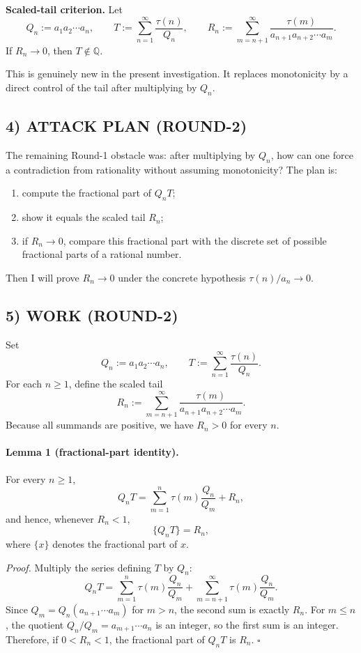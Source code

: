 \medskip
\noindent\textbf{Scaled-tail criterion.}
Let
\[
Q_n:=a_1a_2\cdots a_n,
\qquad
T:=\sum_{n=1}^{\infty}\frac{\tau(n)}{Q_n},
\qquad
R_n:=\sum_{m=n+1}^{\infty}\frac{\tau(m)}{a_{n+1}a_{n+2}\cdots a_m}.
\]
If $R_n\to 0$, then $T\notin\mathbb{Q}$.

This is genuinely new in the present investigation. It replaces monotonicity by a direct control of the tail after multiplying by $Q_n$.

\subsection*{4) ATTACK PLAN (ROUND-2)}
The remaining Round-1 obstacle was: after multiplying by $Q_n$, how can one force a contradiction from rationality without assuming monotonicity? The plan is:
\begin{enumerate}
\item compute the fractional part of $Q_nT$;
\item show it equals the scaled tail $R_n$;
\item if $R_n\to 0$, compare this fractional part with the discrete set of possible fractional parts of a rational number.
\end{enumerate}
Then I will prove $R_n\to 0$ under the concrete hypothesis $\tau(n)/a_n\to 0$.

\subsection*{5) WORK (ROUND-2)}
Set
\[
Q_n:=a_1a_2\cdots a_n,
\qquad
T:=\sum_{n=1}^{\infty}\frac{\tau(n)}{Q_n}.
\]
For each $n\ge 1$, define the scaled tail
\[
R_n:=\sum_{m=n+1}^{\infty}\frac{\tau(m)}{a_{n+1}a_{n+2}\cdots a_m}.
\]
Because all summands are positive, we have $R_n>0$ for every $n$.

\paragraph{Lemma 1 (fractional-part identity).}
For every $n\ge 1$,
\[
Q_nT=\sum_{m=1}^{n}\tau(m)\frac{Q_n}{Q_m}+R_n,
\]
and hence, whenever $R_n<1$,
\[
\{Q_nT\}=R_n,
\]
where $\{x\}$ denotes the fractional part of $x$.

\emph{Proof.}
Multiply the series defining $T$ by $Q_n$:
\[
Q_nT
=\sum_{m=1}^{n}\tau(m)\frac{Q_n}{Q_m}+\sum_{m=n+1}^{\infty}\tau(m)\frac{Q_n}{Q_m}.
\]
Since $Q_m=Q_n(a_{n+1}\cdots a_m)$ for $m>n$, the second sum is exactly $R_n$. For $m\le n$, the quotient $Q_n/Q_m=a_{m+1}\cdots a_n$ is an integer, so the first sum is an integer. Therefore, if $0<R_n<1$, the fractional part of $Q_nT$ is $R_n$.
\hfill $\square$

